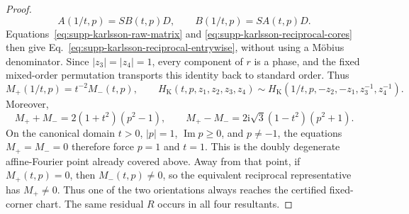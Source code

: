 \documentclass[aps,prx,reprint,nofootinbib,twoside,superscriptaddress,longbibliography,floatfix]{revtex4-2}
\theoremstyle{definition}
\newcommand{\I}{\mathrm i}
\begin{document}
\begin{proof}
\begin{equation}
 A(1/t,p)=S B(t,p)D,\qquad B(1/t,p)=S A(t,p)D.
\label{eq:supp-karlsson-reciprocal-cores}
\end{equation}
Equations~\eqref{eq:supp-karlsson-raw-matrix} and \eqref{eq:supp-karlsson-reciprocal-cores} then give Eq.~\eqref{eq:supp-karlsson-reciprocal-entrywise}, without using a M\"obius denominator.  Since $|z_3|=|z_4|=1$, every component of $r$ is a phase, and the fixed mixed-order permutation transports this identity back to standard order.  Thus
\begin{equation}
M_+(1/t,p)=t^{-2}M_-(t,p),
\qquad
H_{\mathrm K}(t,p,z_1,z_2,z_3,z_4)\sim
H_{\mathrm K}(1/t,p,-z_2,-z_1,z_3^{-1},z_4^{-1}).
\label{eq:supp-karlsson-reciprocal-orientation}
\end{equation}
Moreover,
\begin{equation}
M_++M_-=2(1+t^2)(p^2-1),
\qquad
M_+-M_-=2\I\sqrt3(1-t^2)(p^2+1).
\label{eq:supp-karlsson-common-degeneracy}
\end{equation}
On the canonical domain $t>0$, $|p|=1$, $\operatorname{Im}p\ge0$, and $p\ne-1$, the equations $M_+=M_-=0$ therefore force $p=1$ and $t=1$.  This is the doubly degenerate affine-Fourier point already covered above.  Away from that point, if $M_+(t,p)=0$, then $M_-(t,p)\ne0$, so the equivalent reciprocal representative has $M_+\ne0$.  Thus one of the two orientations always reaches the certified fixed-corner chart.  The same residual $R$ occurs in all four resultants.


\end{proof}
\end{document}
